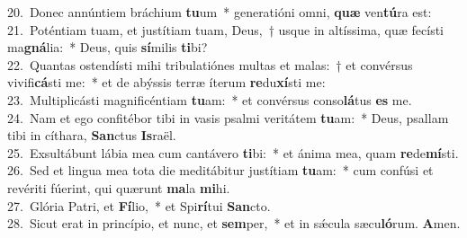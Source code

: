 {20.~}Donec annúntiem bráchium \textbf{tu}um~* generatióni omni, \textbf{quæ} ven\textbf{tú}ra est:\\
{21.~}Poténtiam tuam, et justítiam tuam, Deus,~† usque in altíssima, quæ fecísti ma\textbf{gná}lia:~* Deus, quis \textbf{sí}milis \textbf{ti}bi?\\
{22.~}Quantas ostendísti mihi tribulatiónes multas et malas:~† et convérsus vivifi\textbf{cá}sti me:~* et de abýssis terræ íterum \textbf{re}du\textbf{xí}sti me:\\
{23.~}Multiplicásti magnificéntiam \textbf{tu}am:~* et convérsus conso\textbf{lá}tus \textbf{es} me.\\
{24.~}Nam et ego confitébor tibi in vasis psalmi veritátem \textbf{tu}am:~* Deus, psallam tibi in cíthara, \textbf{San}ctus \textbf{Is}raël.\\
{25.~}Exsultábunt lábia mea cum cantávero \textbf{ti}bi:~* et ánima mea, quam \textbf{re}de\textbf{mí}sti.\\
{26.~}Sed et lingua mea tota die meditábitur justítiam \textbf{tu}am:~* cum confúsi et revériti fúerint, qui quærunt \textbf{ma}la \textbf{mi}hi.\\
{27.~}Glória Patri, et \textbf{Fí}lio,~* et Spi\textbf{rí}tui \textbf{San}cto.\\
{28.~}Sicut erat in princípio, et nunc, et \textbf{sem}per,~* et in sǽcula sæcu\textbf{ló}rum. \textbf{A}men.\\
